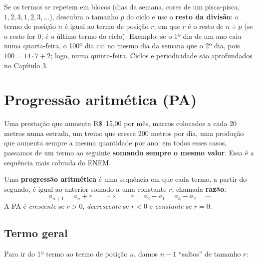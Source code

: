 Se os termos se repetem em blocos (dias da semana, cores de um pisca-pisca,
$1, 2, 3, 1, 2, 3, \dots$), descubra o tamanho $p$ do ciclo e use o
\textbf{resto da divisão}: o termo de posição $n$ é igual ao termo de posição
$r$, em que $r$ é o resto de $n \div p$ (se o resto for 0, é o último termo do
ciclo). Exemplo: se o 1º dia de um ano caiu numa quarta-feira, o 100º dia cai
no mesmo dia da semana que o 2º dia, pois $100 = 14\cdot 7 + 2$; logo, numa
quinta-feira. Ciclos e periodicidade são aprofundados no Capítulo 3.

\section{Progressão aritmética (PA)}

Uma prestação que aumenta R\$~15,00 por mês, marcos colocados a cada 20 metros
numa estrada, um treino que cresce 200 metros por dia, uma produção que aumenta
sempre a mesma quantidade por ano: em todos esses casos, passamos de um termo ao
seguinte \textbf{somando sempre o mesmo valor}. Essa é a sequência mais cobrada
do ENEM.

\begin{definicao}
Uma \textbf{progressão aritmética} é uma sequência em que cada termo, a partir
do segundo, é igual ao anterior somado a uma constante $r$, chamada
\textbf{razão}:
\[
a_{n+1} = a_n + r \qquad\Longleftrightarrow\qquad r = a_2 - a_1 = a_3 - a_2 = \cdots
\]
A PA é \emph{crescente} se $r > 0$, \emph{decrescente} se $r < 0$ e
\emph{constante} se $r = 0$.
\end{definicao}

\subsection{Termo geral}

Para ir do 1º termo ao termo de posição $n$, damos $n-1$ “saltos” de tamanho
$r$:

\begin{center}
\end{center}

